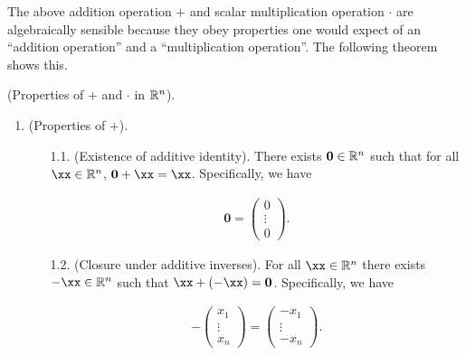 The above addition operation $+$ and scalar multiplication operation $\cdot$ are algebraically sensible because they obey properties one would expect of an ``addition operation'' and a ``multiplication operation''. The following theorem shows this.

\newpage

\begin{theorem}
\label{ch::lin_alg::thm::prop_operations_Rn}
    (Properties of $+$ and $\cdot$ in $\mathbb{R}^n$).
        \begin{enumerate}
            \item (Properties of $+$).
            \begin{enumerate}
                \item[1.1.] (Existence of additive identity). There exists $\mathbf{0} \in \mathbb{R}^n$ such that for all $\xx \in \R^n$, $\mathbf{0} + \xx = \xx$. Specifically, we have
        
                \begin{align*}
                    \mathbf{0} = \begin{pmatrix} 0 \\ \vdots \\ 0 \end{pmatrix}.
                \end{align*}
                
                \item[1.2.] (Closure under additive inverses). For all $\xx \in \R^n$ there exists $-\xx \in \R^n$ such that $\xx + (-\xx) = \mathbf{0}$. Specifically, we have
        
                \begin{align*}
                    -\begin{pmatrix}
                        x_1 \\ \vdots \\ x_n
                    \end{pmatrix}
                    =
                    \begin{pmatrix}
                        -x_1 \\ \vdots \\ -x_n
                    \end{pmatrix}.
                \end{align*}
        

\end{enumerate}
\end{enumerate}
\end{theorem}
